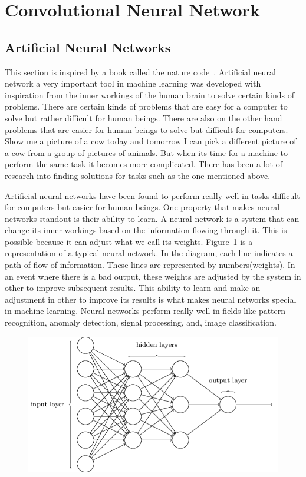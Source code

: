\documentclass[12pt, a4paper,oneside]{report}
\begin{document}
\section{Convolutional Neural Network}

\subsection{Artificial Neural Networks}
This section is inspired by a book called the nature code~\cite{naturecode}. Artificial neural network a very important tool in machine learning was developed with inspiration from the inner workings of the human brain to solve certain kinds of problems. There are certain kinds of problems that are easy for a computer to solve but rather difficult for human beings. There are also on the other hand problems that are easier for human beings to solve but difficult for computers. Show me a picture of a cow today and tomorrow I can pick a different picture of a cow from a group of pictures of animals. But when its time for a machine to perform the same task it becomes more complicated. There has been a lot of research into finding solutions for tasks such as the one mentioned above.

Artificial neural networks have been found to perform really well in tasks difficult for computers but easier for human beings. One property that makes neural networks standout is their ability to learn. A neural network is a system that can change its inner workings based on the information flowing through it. This is possible because it can adjust what we call its weights.
Figure~\ref{fig:neural} is a representation of a typical neural network. In the diagram, each line indicates a path of flow of information. These lines are represented by numbers(weights). In an event where there is a bad output, these weights are adjusted by the system in other to improve subsequent results. This ability to learn and make an adjustment in other to improve its results is what makes neural networks special in machine learning. Neural networks perform really well in fields like pattern recognition, anomaly detection, signal processing, and, image classification.

\begin{figure}[!htbp]
	\includegraphics [scale=0.7] {neural.png}
	\label{fig:neural}
\end{figure}
\end{document}
